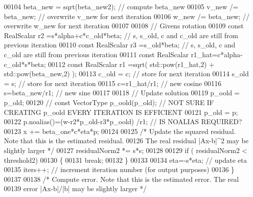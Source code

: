 \begin{DoxyCode}
00104                 beta\_new = sqrt(beta\_new2); \textcolor{comment}{// compute beta\_new}
00105                 v\_new /= beta\_new; \textcolor{comment}{// overwrite v\_new for next iteration}
00106                 w\_new /= beta\_new; \textcolor{comment}{// overwrite w\_new for next iteration}
00107                 
00108                 \textcolor{comment}{// Givens rotation}
00109                 \textcolor{keyword}{const} RealScalar r2 =s*alpha+c*c\_old*beta; \textcolor{comment}{// s, s\_old, c and c\_old are still from previous
       iteration}
00110                 \textcolor{keyword}{const} RealScalar r3 =s\_old*beta; \textcolor{comment}{// s, s\_old, c and c\_old are still from previous iteration}
00111                 \textcolor{keyword}{const} RealScalar r1\_hat=c*alpha-c\_old*s*beta;
00112                 \textcolor{keyword}{const} RealScalar r1 =sqrt( std::pow(r1\_hat,2) + std::pow(beta\_new,2) );
00113                 c\_old = c; \textcolor{comment}{// store for next iteration}
00114                 s\_old = s; \textcolor{comment}{// store for next iteration}
00115                 c=r1\_hat/r1; \textcolor{comment}{// new cosine}
00116                 s=beta\_new/r1; \textcolor{comment}{// new sine}
00117                 
00118                 \textcolor{comment}{// Update solution}
00119                 p\_oold = p\_old;
00120 \textcolor{comment}{//                const VectorType p\_oold(p\_old); // NOT SURE IF CREATING p\_oold EVERY ITERATION IS
       EFFICIENT}
00121                 p\_old = p;
00122                 p.noalias()=(w-r2*p\_old-r3*p\_oold) /r1; \textcolor{comment}{// IS NOALIAS REQUIRED?}
00123                 x += beta\_one*c*eta*p;
00124                 
00125                 \textcolor{comment}{/* Update the squared residual. Note that this is the estimated residual.}
00126 \textcolor{comment}{                The real residual |Ax-b|^2 may be slightly larger */}
00127                 residualNorm2 *= s*s;
00128                 
00129                 \textcolor{keywordflow}{if} ( residualNorm2 < threshold2)
00130                 \{
00131                     \textcolor{keywordflow}{break};
00132                 \}
00133                 
00134                 eta=-s*eta; \textcolor{comment}{// update eta}
00135                 iters++; \textcolor{comment}{// increment iteration number (for output purposes)}
00136             \}
00137             
00138             \textcolor{comment}{/* Compute error. Note that this is the estimated error. The real }
00139 \textcolor{comment}{             error |Ax-b|/|b| may be slightly larger */}

\end{DoxyCode}
